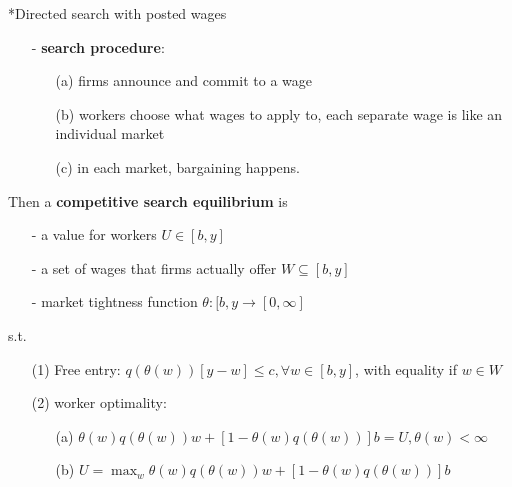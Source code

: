 \documentclass[10pt,landscape,a4paper]{article}
\makeatletter
\renewcommand{\subsection}{\@startsection{subsection}{1}{0mm}{.2ex}{.2ex}{\small\bfseries}}
\makeatother
\begin{document}
\begin{multicols*}{3}
\subsection*{Directed search with posted wages}
\begin{itemize}
    \item[-] \textbf{\color{myred}search procedure}:
    \begin{itemize}
        \item[(a)] firms announce and commit to a wage
        \item[(b)] workers choose what wages to apply to, each separate wage is like an individual market
        \item[(c)] in each market, bargaining happens.
    \end{itemize}
\end{itemize}
Then a \textbf{competitive search equilibrium} is 
\begin{itemize}
    \item[-] a value for workers $U\in [b,y]$
    \item[-] a set of wages that firms actually offer $W\subseteq [b,y]$
    \item[-] market tightness function $\theta:[b,y\rightarrow[0,\infty]$
\end{itemize}
s.t.
\begin{itemize}
    \item[(1)] Free entry: $q(\theta(w))[y-w]\leq c,\forall w\in[b,y] $, with equality if $w\in W$
    \item[(2)] worker optimality:
    \begin{itemize}
        \item[(a)] $\theta(w)q(\theta(w))w+[1-\theta(w)q(\theta(w))]b = U, \theta(w)<\infty$
        \item[(b)] $U=\max_w \theta(w)q(\theta(w))w+[1-\theta(w)q(\theta(w))]b$
    \end{itemize}
\end{itemize}


\end{multicols*}
\end{document}
